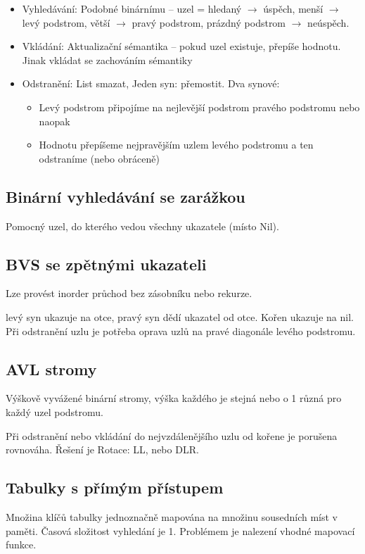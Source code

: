 \documentclass[a4paper, 11pt]{report}
\begin{document}
\begin{itemize}
	\item Vyhledávání: Podobné binárnímu -- uzel = hledaný $\to$ úspěch, menší $\to$ levý podstrom, větší $\to$ pravý podstrom, prázdný podstrom $\to$ neúspěch.
	\item Vkládání: Aktualizační sémantika -- pokud uzel existuje, přepíše hodnotu. Jinak vkládat se zachováním sémantiky
	\item Odstranění: List smazat, Jeden syn: přemostit. Dva synové:
	\begin{itemize}
		\item Levý podstrom připojíme na nejlevější podstrom pravého podstromu nebo naopak
		\item Hodnotu přepíšeme nejpravějším uzlem levého podstromu a ten odstraníme (nebo obráceně)
	\end{itemize}
\end{itemize}

\subsection{Binární vyhledávání se zarážkou}

Pomocný uzel, do kterého vedou všechny ukazatele (místo Nil).

\subsection{BVS se zpětnými ukazateli}
Lze provést inorder průchod bez zásobníku nebo rekurze.

levý syn ukazuje na otce, pravý syn dědí ukazatel od otce. Kořen ukazuje na nil. Při odstranění uzlu je potřeba oprava uzlů na pravé diagonále levého podstromu.

\subsection{AVL stromy}
Výškově vyvážené binární stromy, výška každého je stejná nebo o 1 různá pro každý uzel podstromu.

Při odstranění nebo vkládání do nejvzdálenějšího uzlu od kořene je porušena rovnováha. Řešení je Rotace: LL, nebo DLR.

\subsection{Tabulky s přímým přístupem}

Množina klíčů tabulky jednoznačně mapována na množinu sousedních míst v paměti. Časová složitost vyhledání je 1. Problémem je nalezení vhodné mapovací funkce.
\end{document}
